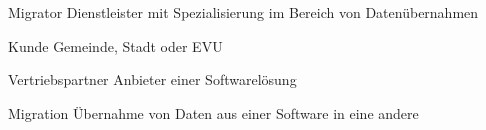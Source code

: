 \begin{glossar}[Prioritätenskala] %
    \item[Migrator]         Dienstleister mit Spezialisierung im Bereich von Datenübernahmen 
    \item[Kunde]            Gemeinde, Stadt oder EVU
    \item[Vertriebspartner] Anbieter einer Softwarelösung
    \item[Migration]        Übernahme von Daten aus einer Software in eine andere
\end{glossar}
